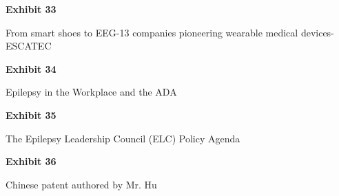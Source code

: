 \documentclass{article}
\begin{document}
%

\vspace*{\fill}
\begin{center}

{\LARGE \bf
Exhibit 33
}

\vspace{10\baselineskip}

{\large From smart shoes to EEG-13 companies pioneering wearable medical devices-ESCATEC}

\end{center}
\vspace*{\fill}

 


\vspace*{\fill}
\begin{center}

{\LARGE \bf
Exhibit 34
}

\vspace{10\baselineskip}

{\large Epilepsy in the Workplace and the ADA}

\end{center}
\vspace*{\fill}


\vspace*{\fill}
\begin{center}

{\LARGE \bf
Exhibit 35
}

\vspace{10\baselineskip}

{\large The Epilepsy Leadership Council (ELC) Policy Agenda}

\end{center}
\vspace*{\fill}

 

\vspace*{\fill}
\begin{center}

{\LARGE \bf
Exhibit 36
}

\vspace{10\baselineskip}

{\large Chinese patent authored by Mr. Hu}

\end{center}
\vspace*{\fill}

% 
\end{document}
